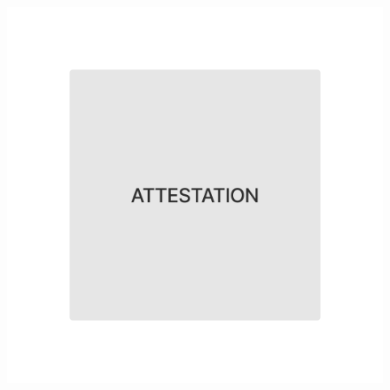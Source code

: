 \begin{figure}[p]
    \centering
    \includegraphics[width=1\textwidth]{chap1.images/ATTESTATION.png}
\end{figure}

\newpage


